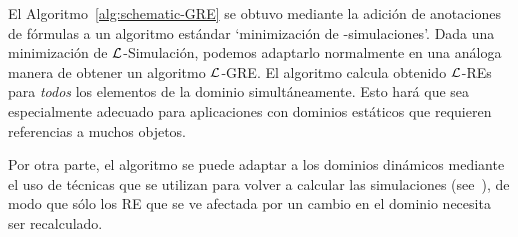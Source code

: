 
%


El Algoritmo~\ref{alg:schematic-GRE} se obtuvo mediante la adici\'on de anotaciones de f\'ormulas
a un algoritmo est\'andar `minimizaci\'on de \EL-simulaciones'. Dada una minimizaci\'on de
$\mathcal{L}$-Simulaci\'on, podemos adaptarlo normalmente en una an\'aloga
manera de obtener un algoritmo $\mathcal{L}$-GRE.
El algoritmo calcula obtenido $\mathcal{L}$-REs para \emph{todos} los elementos de la
dominio simult\'aneamente.
Esto har\'a que sea especialmente adecuado para aplicaciones con
dominios est\'aticos que requieren referencias a muchos objetos.


Por otra parte, el algoritmo se puede adaptar
a los dominios din\'amicos mediante el uso de t\'ecnicas que se utilizan para volver a calcular las simulaciones (see~\cite{saha:incre07}),
de modo que s\'olo los RE que se ve afectada por un cambio en el dominio necesita ser
recalculado.


